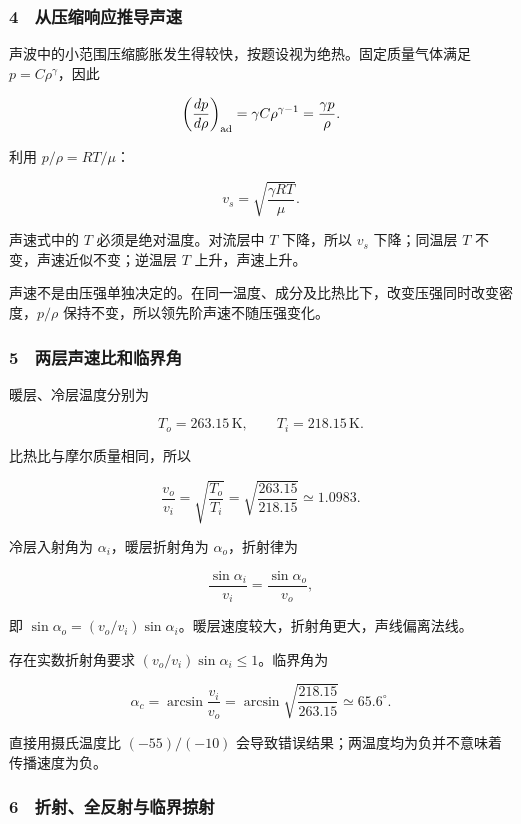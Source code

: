 \documentclass[12pt,a4paper,fontset=fandol]{ctexart}
\begin{document}
\subsubsection{4　从压缩响应推导声速}\label{ux4eceux538bux7f29ux54cdux5e94ux63a8ux5bfcux58f0ux901f}

声波中的小范围压缩膨胀发生得较快，按题设视为绝热。固定质量气体满足
\(p=C\rho^\gamma\)，因此

\[\left(\frac{dp}{d\rho}\right)_{\rm ad}
=\gamma C\rho^{\gamma-1}=\frac{\gamma p}{\rho}.\]

利用 \(p/\rho=RT/\mu\)：

\[\boxed{v_s=\sqrt{\frac{\gamma RT}{\mu}}.}\]

声速式中的 \(T\) 必须是绝对温度。对流层中 \(T\) 下降，所以 \(v_s\)
下降；同温层 \(T\) 不变，声速近似不变；逆温层 \(T\) 上升，声速上升。

声速不是由压强单独决定的。在同一温度、成分及比热比下，改变压强同时改变密度，\(p/\rho\)
保持不变，所以领先阶声速不随压强变化。

\subsubsection{5　两层声速比和临界角}\label{ux4e24ux5c42ux58f0ux901fux6bd4ux548cux4e34ux754cux89d2}

暖层、冷层温度分别为

\[T_o=263.15\,\mathrm K,\qquad T_i=218.15\,\mathrm K.\]

比热比与摩尔质量相同，所以

\[\frac{v_o}{v_i}=\sqrt{\frac{T_o}{T_i}}
=\sqrt{\frac{263.15}{218.15}}\simeq1.0983.\]

冷层入射角为 \(\alpha_i\)，暖层折射角为 \(\alpha_o\)，折射律为

\[\frac{\sin\alpha_i}{v_i}=\frac{\sin\alpha_o}{v_o},\]

即
\(\sin\alpha_o=(v_o/v_i)\sin\alpha_i\)。暖层速度较大，折射角更大，声线偏离法线。

存在实数折射角要求 \((v_o/v_i)\sin\alpha_i\le1\)。临界角为

\[\boxed{\alpha_c=\arcsin\frac{v_i}{v_o}
=\arcsin\sqrt{\frac{218.15}{263.15}}
\simeq65.6^\circ.}\]

直接用摄氏温度比 \((-55)/(-10)\)
会导致错误结果；两温度均为负并不意味着传播速度为负。

\subsubsection{6　折射、全反射与临界掠射}\label{ux6298ux5c04ux5168ux53cdux5c04ux4e0eux4e34ux754cux63a0ux5c04}
\end{document}
